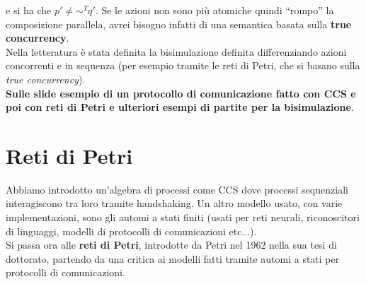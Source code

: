 \documentclass[a4paper,12pt, oneside]{book}
\begin{document}
e si ha che $p'\neq\sim^Tq'$. Se le azioni non sono più atomiche quindi
``rompo'' la composizione parallela, avrei bisogno infatti di una semantica
basata sulla \textbf{true concurrency}.\\
Nella letteratura è stata definita la bisimulazione definita differenziando
azioni concorrenti e in sequenza (per esempio tramite le reti di Petri, che si
basano sulla \textit{true concurrency}).\\
\textbf{Sulle slide esempio di un protocollo di comunicazione fatto con CCS e
  poi con reti di Petri e ulteriori esempi di partite per la bisimulazione}.
\chapter{Reti di Petri}


Abbiamo introdotto un'algebra di processi come CCS dove processi sequenziali
interagiscono tra loro tramite handshaking. Un altro modello usato, con varie
implementazioni, sono gli automi a stati finiti (usati per reti neurali,
riconoscitori di linguaggi, modelli di protocolli di comunicazioni
etc$\ldots$).\\
Si passa ora alle \textbf{reti di Petri}, introdotte da Petri nel 1962 nella sua
tesi di dottorato, partendo da una critica ai modelli fatti tramite automi a
stati per protocolli di comunicazioni.\\
\end{document}

